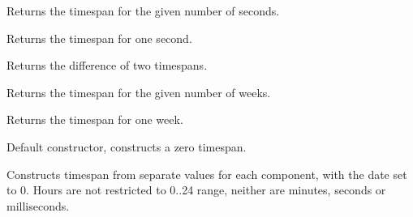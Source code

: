 \label{wxtimespanseconds}


Returns the timespan for the given number of seconds.

\label{wxtimespansecond}


Returns the timespan for one second.

\label{wxtimespansubstract}




Returns the difference of two timespans.

\label{wxtimespanweeks}


Returns the timespan for the given number of weeks.

\label{wxtimespanweek}


Returns the timespan for one week.

\label{wxtimespanctor}


Default constructor, constructs a zero timespan.


Constructs timespan from separate values for each component, with the date
set to 0. Hours are not restricted to 0..24 range, neither are
minutes, seconds or milliseconds.

